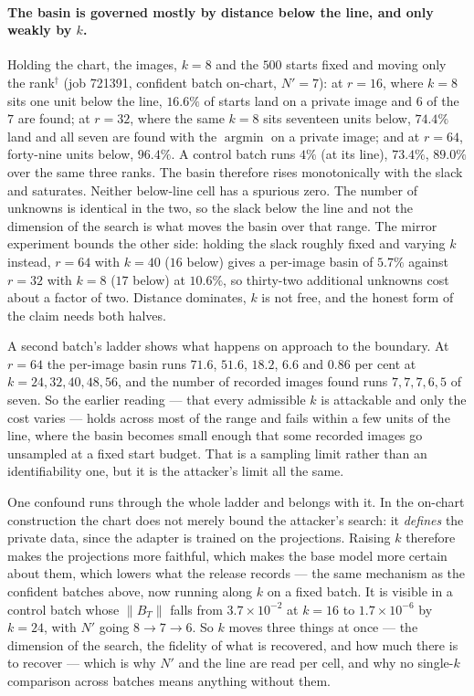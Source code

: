 \paragraph{The basin is governed mostly by distance below the line, and only
weakly by $k$.}
Holding the chart, the images, $k=8$ and the $500$ starts fixed and moving
only the rank$^\dagger$ (job 721391, confident batch on-chart, $N'=7$): at
$r=16$, where $k=8$ sits one unit below the line, $16.6\%$ of starts land on a
private image and $6$ of the $7$ are found; at $r=32$, where the same $k=8$
sits seventeen units below, $74.4\%$ land and all seven are found with the
$\operatorname{argmin}$ on a private image; and at $r=64$, forty-nine units
below, $96.4\%$. A control batch runs $4\%$ (at its line), $73.4\%$, $89.0\%$
over the same three ranks. The basin therefore rises monotonically with the
slack and saturates. Neither below-line cell has a spurious zero.
The number of unknowns is identical in the two, so the slack below the line
and not the dimension of the search is what moves the basin over that range.
The mirror experiment bounds the other side: holding the slack roughly fixed
and varying $k$ instead, $r=64$ with $k=40$ ($16$ below) gives a per-image
basin of $5.7\%$ against $r=32$ with $k=8$ ($17$ below) at $10.6\%$, so
thirty-two additional unknowns cost about a factor of two. Distance dominates,
$k$ is not free, and the honest form of the claim needs both halves.

A second batch's ladder shows what happens on approach to the boundary. At
$r=64$ the per-image basin runs $71.6$, $51.6$, $18.2$, $6.6$ and $0.86$ per
cent at $k=24,32,40,48,56$, and the number of recorded images found runs
$7,7,7,6,5$ of seven. So the earlier reading --- that every admissible $k$ is
attackable and only the cost varies --- holds across most of the range and
fails within a few units of the line, where the basin becomes small enough
that some recorded images go unsampled at a fixed start budget. That is a
sampling limit rather than an identifiability one, but it is the attacker's
limit all the same.

One confound runs through the whole ladder and belongs with it. In the
on-chart construction the chart does not merely bound the attacker's search:
it \emph{defines} the private data, since the adapter is trained on the
projections. Raising $k$ therefore makes the projections more faithful, which
makes the base model more certain about them, which lowers what the release
records --- the same mechanism as the confident batches above, now running
along $k$ on a fixed batch. It is visible in a control batch whose $\|B_T\|$
falls from $3.7\times10^{-2}$ at $k=16$ to $1.7\times10^{-6}$ by $k=24$, with
$N'$ going $8\to7\to6$. So $k$ moves three things at once --- the dimension of
the search, the fidelity of what is recovered, and how much there is to
recover --- which is why $N'$ and the line are read per cell, and why no
single-$k$ comparison across batches means anything without them.


